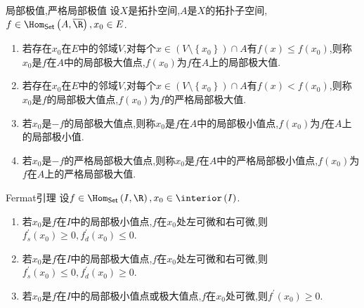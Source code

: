 \begin{definition}{局部极值,严格局部极值}{}
	设$X$是拓扑空间,$A$是$X$的拓扑子空间,$f\in\Hom_{\mathsf{Set}}\left(A,\overline{\R}\right),x_{0}\in E$.
	\begin{enumerate}
		\item 若存在$x_{0}$在$E$中的邻域$V$,对每个$x\in\left(V\setminus\left\{x_{0}\right\}\right)\cap A$有$f\left(x\right)\leq f\left(x_{0}\right)$,则称$x_{0}$是$f$在$A$中的局部极大值点,$f\left(x_{0}\right)$为$f$在$A$上的局部极大值.
		\item 若存在$x_{0}$在$E$中的邻域$V$,对每个$x\in\left(V\setminus\left\{x_{0}\right\}\right)\cap A$有$f\left(x\right)<f\left(x_{0}\right)$,则称$x_{0}$是$f$的局部极大值点,$f\left(x_{0}\right)$为$f$的严格局部极大值.
		\item 若$x_{0}$是$-f$的局部极大值点,则称$x_{0}$是$f$在$A$中的局部极小值点,$f\left(x_{0}\right)$为$f$在$A$上的局部极小值.
		\item 若$x_{0}$是$-f$的严格局部极大值点,则称$x_{0}$是$f$在$A$中的严格局部极小值点,$f\left(x_{0}\right)$为$f$在$A$上的严格局部极大值.
	\end{enumerate}
\end{definition}

\begin{proposition}{Fermat引理}{}
	设$f\in\Hom_{\mathsf{Set}}\left(I,\R\right),x_{0}\in\interior\left(I\right)$.
	\begin{enumerate}
		\item 若$x_{0}$是$f$在$I$中的局部极小值点,$f$在$x_{0}$处左可微和右可微,则$f_{s}^{\prime}\left(x_{0}\right)\geq 0,f_{d}^{\prime}\left(x_{0}\right)\leq 0$.
		\item 若$x_{0}$是$f$在$I$中的局部极大值点,$f$在$x_{0}$处左可微和右可微,则$f_{s}^{\prime}\left(x_{0}\right)\leq 0,f_{d}^{\prime}\left(x_{0}\right)\geq 0$.
		\item 若$x_{0}$是$f$在$I$中的局部极小值点或极大值点,$f$在$x_{0}$处可微,则$f^{\prime}\left(x_{0}\right)\geq 0$.
	\end{enumerate}
\end{proposition}






